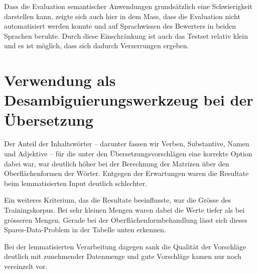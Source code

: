 \documentclass[11pt,twoside,openright]{mpreport}
\begin{document}
Dass die Evaluation semantischer Anwendungen grundsätzlich eine Schwierigkeit darstellen kann, zeigte sich auch hier in dem Mass, dass die Evaluation nicht automatisiert werden konnte und auf Sprachwissen des Bewerters in beiden Sprachen beruhte. Durch diese Einschränkung ist auch das Testset relativ klein und es ist möglich, dass sich dadurch Verzerrungen ergeben.

\section{Verwendung als Desambiguierungswerkzeug bei der Übersetzung}

Der Anteil der Inhaltswörter -- darunter fassen wir Verben, Substantive, Namen und Adjektive -- für die unter den Übersetzungsvorschlägen eine korrekte Option dabei war, war deutlich höher bei der Berechnung der Matrizen über den Oberflächenformen der Wörter. Entgegen der Erwartungen waren die Resultate beim lemmatisierten Input deutlich schlechter.

Ein weiteres Kriterium, das die Resultate beeinflusste, war die Grösse des Trainingskorpus. Bei sehr kleinen Mengen waren dabei die Werte tiefer als bei grösseren Mengen. Gerade bei der Oberflächenformbehandlung lässt sich dieses Spares-Data-Problem in der Tabelle unten erkennen.

Bei der lemmatisierten Verarbeitung dagegen sank die Qualität der Vorschläge deutlich mit zunehmender Datenmenge und gute Vorschläge kamen nur noch vereinzelt vor.

\hspace{-6cm}
\end{document}
